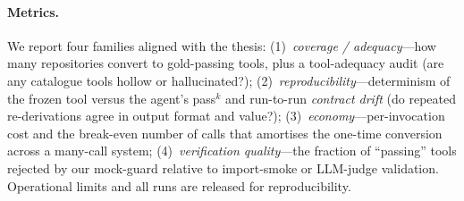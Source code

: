 \paragraph{Metrics.}
We report four families aligned with the thesis:
(1)~\emph{coverage / adequacy}---how many repositories convert to gold-passing
tools, plus a tool-adequacy audit (are any catalogue tools hollow or
hallucinated?);
(2)~\emph{reproducibility}---determinism of the frozen tool versus the agent's
pass$^k$ and run-to-run \emph{contract drift} (do repeated re-derivations agree
in output format and value?);
(3)~\emph{economy}---per-invocation cost and the break-even number of calls that
amortises the one-time conversion across a many-call system;
(4)~\emph{verification quality}---the fraction of ``passing'' tools rejected by
our mock-guard relative to import-smoke or LLM-judge validation.
Operational limits and all runs are released for reproducibility.
